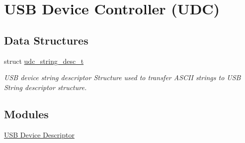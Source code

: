 \hypertarget{group__udc__group}{
\section{\-U\-S\-B \-Device \-Controller (\-U\-D\-C)}
\label{group__udc__group}
}
\subsection*{\-Data \-Structures}
\begin{DoxyCompactItemize}
\item 
struct \hyperlink{structudc__string__desc__t}{udc\-\_\-string\-\_\-desc\-\_\-t}
\begin{DoxyCompactList}\small\item\em \-U\-S\-B device string descriptor \-Structure used to transfer \-A\-S\-C\-I\-I strings to \-U\-S\-B \-String descriptor structure. \end{DoxyCompactList}\end{DoxyCompactItemize}
\subsection*{\-Modules}
\begin{DoxyCompactItemize}
\item 
\hyperlink{group__udc__desc__group}{\-U\-S\-B Device Descriptor}
\end{DoxyCompactItemize}

